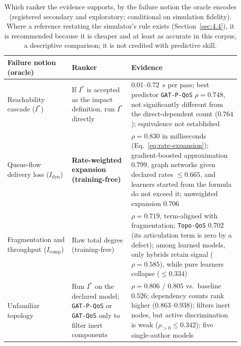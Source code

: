 \begin{table}[htbp]
\centering
\small
\caption{Which ranker the evidence supports, by the failure notion the oracle encodes (registered secondary and exploratory; conditional on simulation fidelity). Where a reference restating the simulator's rule exists (Section~\ref{sec:4.4}), it is recommended because it is cheaper and at least as accurate in this corpus, a descriptive comparison; it is not credited with predictive skill.}
\label{tab:guidance}
\begin{tabular}{@{}p{0.26\linewidth}>{\raggedright\arraybackslash}p{0.24\linewidth}p{0.44\linewidth}@{}}
\toprule
\textbf{Failure notion (oracle)} & \textbf{Ranker} & \textbf{Evidence} \\
\midrule
Reachability cascade ($I^*$) & If $I^*$ is accepted as the impact definition, run $I^*$ directly & $0.01$--$0.72$~s per pass; best predictor \texttt{GAT-P-QoS} $\rho = 0.748$, not significantly different from the direct-dependent count ($0.764$); equivalence not established \\
Queue-flow delivery loss ($I_{\text{dyn}}$) & \textbf{Rate-weighted expansion (training-free)} & $\rho = 0.830$ in milliseconds (Eq.~\eqref{eq:rate-expansion}); gradient-boosted approximation $0.799$, graph networks given declared rates $\le 0.665$, and learners started from the formula do not exceed it; unweighted expansion $0.706$ \\
Fragmentation and throughput ($I_{\text{comp}}$) & Raw total degree (training-free) & $\rho = 0.719$, term-aligned with fragmentation; \texttt{Topo-QoS} $0.702$ (its articulation term is zero by a defect); among learned models, only hybrids retain signal ($\rho = 0.585$), while pure learners collapse ($\le 0.334$) \\
Unfamiliar topology & Run $I^*$ on the declared model; \texttt{GAT-P-QoS} or \texttt{GAT-QoS} only to filter inert components & $\rho = 0.806$ / $0.805$ vs.\ baseline $0.526$; dependency counts rank higher ($0.863$--$0.938$); filters inert nodes, but active discrimination is weak ($\rho_{>0} \le 0.342$); five single-author models \\
\bottomrule
\end{tabular}
\end{table}

